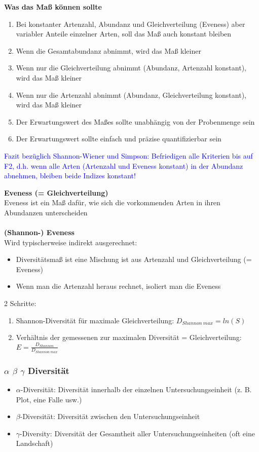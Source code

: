 \newpage
\textbf{Was das Maß können sollte}
\begin{enumerate}
	\item Bei konstanter Artenzahl, Abundanz und Gleichverteilung (Eveness) aber variabler Anteile einzelner Arten, soll das Maß auch konstant bleiben
	\item Wenn die Gesamtabundanz abnimmt, wird das Maß kleiner
	\item Wenn nur die Gleichverteilung abnimmt (Abundanz, Artenzahl konstant), wird das Maß kleiner
	\item Wenn nur die Artenzahl abnimmt (Abundanz, Gleichverteilung konstant), wird das Maß kleiner
	\item Der Erwartungswert des Maßes sollte unabhängig von der Probenmenge sein
	\item Der Erwartungswert sollte einfach und präzise quantifizierbar sein
\end{enumerate}

\textcolor{blue}{Fazit bezüglich Shannon-Wiener und Simpson: Befriedigen alle Kriterien bis auf F2, d.h. wenn alle Arten (Artenzahl und Eveness konstant) in der Abundanz abnehmen, bleiben beide Indizes konstant!}

\newpage
\textbf{Eveness (= Gleichverteilung)}\\
Eveness ist ein Maß dafür, wie sich die vorkommenden Arten in ihren Abundanzen unterscheiden
\\\\
\textbf{(Shannon-) Eveness}\\
Wird typischerweise indirekt ausgerechnet:
\begin{itemize}
	\item Diversitätsmaß ist eine Mischung ist aus Artenzahl und Gleichverteilung (= Eveness)
	\item Wenn man die Artenzahl heraus rechnet, isoliert man die Eveness
\end{itemize}

2 Schritte:
\begin{enumerate}
	\item Shannon-Diversität für maximale Gleichverteilung: $D_{Shannon\ max}=ln(S)$
	\item Verhältnis der gemessenen zur maximalen Diversität = Gleichverteilung: $E=\frac{D_{Shannon}}{D_{Shannon\ max}}$
\end{enumerate}

\subsubsection{$\alpha$ $\beta$ $\gamma$ Diversität}
\begin{itemize}
	\item $\alpha$-Diversität: Diversität innerhalb der einzelnen Untersuchungseinheit (z. B. Plot, eine Falle usw.)
	\item $\beta$-Diversität: Diversität zwischen den Untersuchungseinheit
	\item $\gamma$-Diversity: Diversität der Gesamtheit aller Untersuchungseinheiten (oft eine Landschaft)
\end{itemize}

